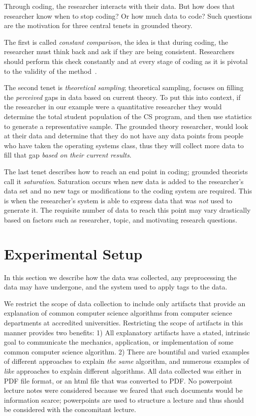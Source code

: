 \documentclass[sigconf]{acmart}
\begin{document}
Through coding, the researcher interacts with their data. But how does that
researcher know when to stop coding? Or how much data to code? Such questions
are the motivation for three central tenets in grounded theory.
 
The first is called \emph{constant comparison}, the idea is that during coding,
the researcher must think back and ask if they are being consistent. Researchers
should perform this check constantly and at every stage of coding as it is
pivotal to the validity of the method~\cite{Strauss67discoveryof}.
 
The second tenet is \emph{theoretical sampling}; theoretical sampling, focuses
on filling the \emph{perceived} gaps in data based on current theory. To put
this into context, if the researcher in our example were a quantitative
researcher they would determine the total student population of the CS program,
and then use statistics to generate a representative sample. The grounded
theory researcher, would look at their data and determine that they do not have
any data points from people who have taken the operating systems class, thus
they will collect more data to fill that gap \emph{based on their current
  results}.
 
The last tenet describes how to reach an end point in coding; grounded theorists
call it \emph{saturation}. Saturation occurs when new data is added to the
researcher's data set and no new tags or modifications to the coding system are
required. This is when the researcher's system is able to express data that was
\emph{not} used to generate it. The requisite number of data to reach this point
may vary drastically based on factors such as researcher, topic, and motivating
research questions.

\section{Experimental Setup}
\label{sec:exp:data}
In this section we describe how the data was collected, any preprocessing the
data may have undergone, and the system used to apply tags to the data. 

We restrict the scope of data collection to include only artifacts that provide
an explanation of common computer science algorithms from computer science
departments at accredited universities. Restricting the scope of artifacts in
this manner provides two benefits: 1) All explanatory artifacts have a stated,
intrinsic goal to communicate the mechanics, application, or implementation of
some common computer science algorithm. 2) There are bountiful and varied
examples of different approaches to explain \emph{the same} algorithm, and
numerous examples of \emph{like} approaches to explain different algorithms. All
data collected was either in PDF file format, or an html file that was converted
to PDF. No powerpoint lecture notes were considered because we feared that such
documents would be information scarce; powerpoints are used to structure a
lecture and thus should be considered with the concomitant lecture.
\end{document}
